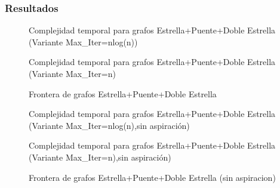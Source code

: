 \subsubsection{Resultados}

\begin{figure}[H]
    \centering
    \fontsize{8}{10}\selectfont
    \resizebox{0.87\textwidth}{!}{}
    \caption{Complejidad temporal para grafos Estrella+Puente+Doble Estrella (Variante Max\_Iter=nlog(n))}
\end{figure}

\begin{figure}[H]
    \centering
    \fontsize{8}{10}\selectfont
    \resizebox{0.87\textwidth}{!}{}
    \caption{Complejidad temporal para grafos Estrella+Puente+Doble Estrella (Variante Max\_Iter=n)}
\end{figure}

\begin{figure}[H]
    \centering
    \fontsize{8}{10}\selectfont
    \resizebox{0.87\textwidth}{!}{}
    \caption{Frontera de grafos Estrella+Puente+Doble Estrella}
\end{figure}

\begin{figure}[H]
    \centering
    \fontsize{8}{10}\selectfont
    \resizebox{0.87\textwidth}{!}{}
    \caption{Complejidad temporal para grafos Estrella+Puente+Doble Estrella (Variante Max\_Iter=nlog(n),sin aspiraci\'on)}
\end{figure}

\begin{figure}[H]
    \centering
    \fontsize{8}{10}\selectfont
    \resizebox{0.87\textwidth}{!}{}
    \caption{Complejidad temporal para grafos Estrella+Puente+Doble Estrella (Variante Max\_Iter=n),sin aspiraci\'on)}
\end{figure}

\begin{figure}[H]
    \centering
    \fontsize{8}{10}\selectfont
    \resizebox{0.87\textwidth}{!}{}
    \caption{Frontera de grafos Estrella+Puente+Doble Estrella (sin aspiracion)}
\end{figure}

